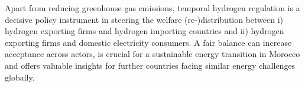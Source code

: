 Apart from reducing greenhouse gas emissions, temporal hydrogen regulation is a decisive policy instrument in steering the welfare (re-)distribution between i) hydrogen exporting firms and hydrogen importing countries and ii) hydrogen exporting firms and domestic electricity consumers. 
A fair balance can increase acceptance across actors, is crucial for a sustainable energy transition in Morocco and offers valuable insights for further countries facing similar energy challenges globally.





